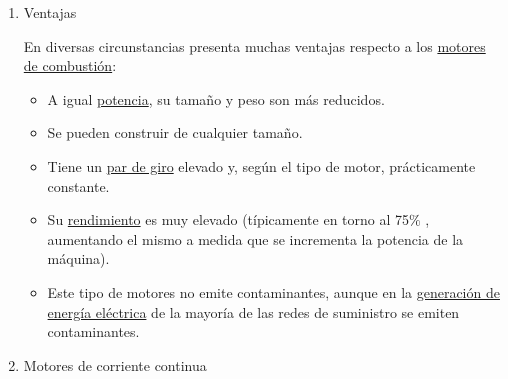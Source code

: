 \documentclass[12pt]{article}
\begin{document}
\begin{enumerate}

\par

	\item Ventajas\par

En diversas circunstancias presenta muchas ventajas respecto a los \href{http://es.wikipedia.org/wiki/Motor_de_combustión}{motores de combustión}:\par

\setlength{\parskip}{0.0pt}
\begin{itemize}
	\item A igual \href{http://es.wikipedia.org/wiki/Potencia}{potencia}, su tamaño y peso son más reducidos. \par

	\item Se pueden construir de cualquier tamaño. \par

	\item Tiene un \href{http://es.wikipedia.org/wiki/Par_de_giro}{par de giro} elevado y, según el tipo de motor, prácticamente constante. \par

	\item Su \href{http://es.wikipedia.org/wiki/Rendimiento}{rendimiento} es muy elevado (típicamente en torno al 75$\%$ , aumentando el mismo a medida que se incrementa la potencia de la máquina). \par

\setlength{\parskip}{14.04pt}
	\item Este tipo de motores no emite contaminantes, aunque en la \href{http://es.wikipedia.org/wiki/Generación_de_energía_eléctrica}{generación de energía eléctrica} de la mayoría de las redes de suministro se emiten contaminantes. 
\end{itemize}\par

	\item Motores de corriente continua\par


\vspace{\baselineskip}





\end{enumerate}
\end{document}
